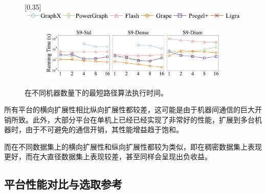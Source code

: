 \begin{figure}[h]\centering

    \scalebox{0.35}[0.35]{\includegraphics{figures/vertical_scalability_legend.pdf}}
    
    \begin{subfigure}[b]{0.8\textwidth}
        \includegraphics[width=\textwidth]{figures/sssp_horizontal_scalability_9.pdf}
    \end{subfigure}

    \caption{在不同机器数量下的最短路径算法执行时间。}
    \label{fig:exp_scalability_machines_9}
\end{figure}

所有平台的横向扩展性相比纵向扩展性都较差，这可能是由于机器间通信的巨大开销所致。此外，大部分平台在单机上已经已经实现了非常好的性能，扩展到多台机器时，由于不可避免的通信开销，其性能增益趋于饱和。

而在不同数据集上的横向扩展性和纵向扩展性都较为类似，即在稠密数据集上表现更好，而在大直径数据集上表现较差，甚至同样会呈现出负收益。

\subsection{平台性能对比与选取参考}

